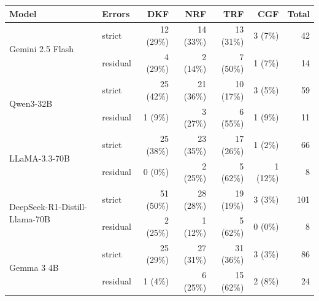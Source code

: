\begin{tabular}{llrrrrr}
\toprule
\textbf{Model} & \textbf{Errors} & \textbf{DKF} & \textbf{NRF} & \textbf{TRF} & \textbf{CGF} & \textbf{Total} \\
\midrule
\multirow{2}{*}{Gemini 2.5 Flash} & strict & 12 (29\%) & 14 (33\%) & 13 (31\%) & 3 (7\%) & 42 \\
 & residual & 4 (29\%) & 2 (14\%) & 7 (50\%) & 1 (7\%) & 14 \\
\multirow{2}{*}{Qwen3-32B} & strict & 25 (42\%) & 21 (36\%) & 10 (17\%) & 3 (5\%) & 59 \\
 & residual & 1 (9\%) & 3 (27\%) & 6 (55\%) & 1 (9\%) & 11 \\
\multirow{2}{*}{LLaMA-3.3-70B} & strict & 25 (38\%) & 23 (35\%) & 17 (26\%) & 1 (2\%) & 66 \\
 & residual & 0 (0\%) & 2 (25\%) & 5 (62\%) & 1 (12\%) & 8 \\
\multirow{2}{*}{DeepSeek-R1-Distill-Llama-70B} & strict & 51 (50\%) & 28 (28\%) & 19 (19\%) & 3 (3\%) & 101 \\
 & residual & 2 (25\%) & 1 (12\%) & 5 (62\%) & 0 (0\%) & 8 \\
\multirow{2}{*}{Gemma 3 4B} & strict & 25 (29\%) & 27 (31\%) & 31 (36\%) & 3 (3\%) & 86 \\
 & residual & 1 (4\%) & 6 (25\%) & 15 (62\%) & 2 (8\%) & 24 \\
\bottomrule
\end{tabular}
